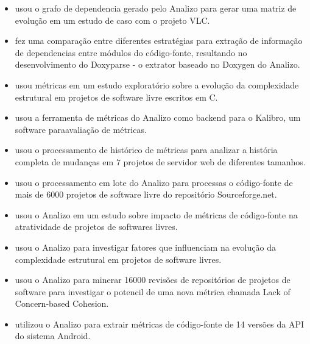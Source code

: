 \documentclass{article}
\begin{document}
\begin{itemize}

\item \cite{Amaral2009} usou o grafo de dependencia gerado pelo Analizo para
gerar uma matriz de evolução em um estudo de caso com o projeto VLC.

\item \cite{Costa2009} fez uma comparação entre diferentes estratégias para
extração de informação de dependencias entre módulos do código-fonte,
resultando no desenvolvimento do Doxyparse - o extrator baseado no Doxygen do
Analizo.

\item \cite{Terceiro2009} usou métricas em um estudo exploratório sobre a
evolução da complexidade estrutural em projetos de software livre escritos em
C.

\item \cite{Morais2009} usou a ferramenta de métricas do Analizo como backend
para o Kalibro, um software paraavaliação de métricas.

\item \cite{Terceiro2010} usou o processamento de histórico de métricas para
analizar a história completa de mudanças em 7 projetos de servidor web de
diferentes tamanhos.

\item \cite{Meirelles2010} usou o processamento em lote do Analizo para
processas o código-fonte de mais de 6000 projetos de software livre do
repositório Sourceforge.net.

\item \cite{Meirelles2011} usou o Analizo em um estudo sobre impacto de
métricas de código-fonte na atratividade de projetos de softwares livres.

\item \cite{Terceiro2012Understanding} usou o Analizo para investigar fatores
que influenciam na evolução da complexidade estrutural em projetos de software
livres.

\item \cite{Silva2012} usou o Analizo para minerar 16000 revisões de
repositórios de projetos de software para investigar o potencil de uma nova
métrica chamada Lack of Concern-based Cohesion.

\item \cite{Ronaldo2015} utilizou o Analizo para extrair métricas de
código-fonte de 14 versões da API do sistema Android.

\end{itemize}
\end{document}
